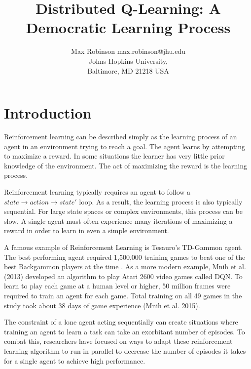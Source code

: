 \documentclass[jair,twoside,11pt,theapa]{article}
\begin{document}
\title{Distributed Q-Learning: A Democratic Learning Process}

\author{\name Max Robinson \email max.robinson@jhu.edu \\
       \addr Johns Hopkins University,\\
       Baltimore, MD 21218 USA
   }


\maketitle

\begin{abstract}

\end{abstract}

\section{Introduction}
\label{Introduction}
Reinforcement learning can be described simply as the learning process of an agent in an environment trying to reach a goal. 
The agent learns by attempting to maximize a reward. In some situations the learner has very little prior knowledge of the environment. 
The act of maximizing the reward is the learning process.

Reinforcement learning typically requires an agent to follow a $state \to action \to state'$ loop. As a result, the learning process is also typically sequential. 
For large state spaces or complex environments, this process can be slow. A single agent must often experience many iterations of maximizing 
a reward in order to learn in even a simple environment.

A famous example of Reinforcement Learning is Tesauro's TD-Gammon agent.
The best performing agent required 1,500,000 training games to beat one of the best Backgammon players at the time \cite{Tesauro:1995:TDL:203330.203343}.
As a more modern example, Mnih et al. (2013) \nocite{Mnih2013} developed an algorithm to play Atari 2600 video games called DQN. To learn to play each game at a human level or higher,
50 million frames were required to train an agent for each game. Total training on all 49 games in the study took about 38 days of game experience (Mnih et al. 2015). 

The constraint of a lone agent acting sequentially can create situations where training an agent to learn a task can take an exorbitant number of episodes. 
To combat this, researchers have focused on ways to adapt these reinforcement learning algorithm to run in parallel to decrease the number of episodes it takes for a single agent to achieve high performance.
\end{document}

